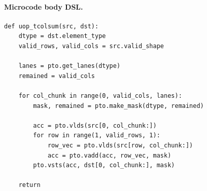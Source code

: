 \paragraph{Microcode body DSL.}
\begin{lstlisting}[style=ptocode]
def uop_tcolsum(src, dst):
    dtype = dst.element_type
    valid_rows, valid_cols = src.valid_shape

    lanes = pto.get_lanes(dtype)
    remained = valid_cols

    for col_chunk in range(0, valid_cols, lanes):
        mask, remained = pto.make_mask(dtype, remained)

        acc = pto.vlds(src[0, col_chunk:])
        for row in range(1, valid_rows, 1):
            row_vec = pto.vlds(src[row, col_chunk:])
            acc = pto.vadd(acc, row_vec, mask)
        pto.vsts(acc, dst[0, col_chunk:], mask)

    return
\end{lstlisting}
\Needspace{0.34\textheight}
